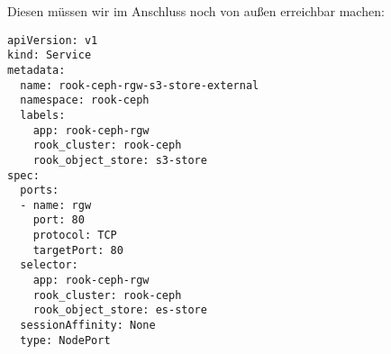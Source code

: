 Diesen müssen wir im Anschluss noch von außen erreichbar machen:

\begin{verbatim}
apiVersion: v1
kind: Service
metadata:
  name: rook-ceph-rgw-s3-store-external
  namespace: rook-ceph
  labels:
    app: rook-ceph-rgw
    rook_cluster: rook-ceph
    rook_object_store: s3-store
spec:
  ports:
  - name: rgw
    port: 80
    protocol: TCP
    targetPort: 80
  selector:
    app: rook-ceph-rgw
    rook_cluster: rook-ceph
    rook_object_store: es-store
  sessionAffinity: None
  type: NodePort
\end{verbatim}
